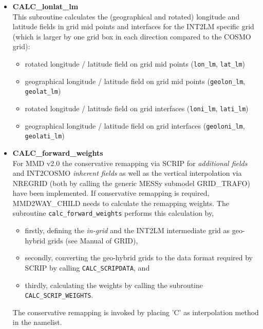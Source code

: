 \documentclass[11pt,twoside]{article}
\begin{document}
\begin{itemize}
\item {\bf CALC\_lonlat\_lm \\}
This subroutine calculates the (geographical and rotated) longitude and latitude
fields in grid mid points and interfaces for the INT2LM specific grid
(which is larger by one grid box in each direction compared to the
COSMO grid):
\begin{itemize}
\item rotated longitude / latitude field on grid mid points  (\verb|lon_lm|, \verb|lat_lm|)
\item geographical  longitude / latitude field on grid mid points (\verb|geolon_lm|, \verb|geolat_lm|)
\item rotated longitude / latitude field on grid interfaces  (\verb|loni_lm|, \verb|lati_lm|)
\item geographical  longitude / latitude field on grid interfaces (\verb|geoloni_lm|, \verb|geolati_lm|)
\end{itemize}

\item {\bf CALC\_forward\_weights \\}
For MMD v2.0 the conservative remapping via SCRIP for {\it additional
fields} and INT2COSMO {\it inherent fields} as well as the vertical
interpolation via NREGRID (both by calling the generic MESSy submodel
GRID\_TRAFO) have been implemented.
If conservative remapping is required, MMD2WAY\_CHILD needs to
calculate the remapping weights. The
subroutine \verb|calc_forward_weights| performs this calculation by,
\begin{itemize}
\item firstly, defining the {\it in-grid} and the INT2LM intermediate grid as
geo-hybrid grids (see Manual of GRID),
\item secondly, converting the geo-hybrid grids to the data format
required by SCRIP by calling \verb|CALC_SCRIPDATA|, and
\item thirdly, calculating the weights by calling  the
subroutine \verb|CALC_SCRIP_WEIGHTS|.
\end{itemize}
The conservative remapping is invoked by placing 'C' as interpolation
method in the namelist.


\end{itemize}
\end{document}
